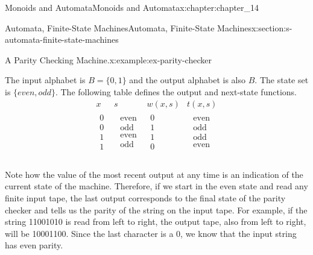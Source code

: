 \documentclass[twoside,10pt,]{book}
\numberwithin{equation}{section}
\begin{document}
\begin{chapterptx}{Monoids and Automata}{}{Monoids and Automata}{}{}{x:chapter:chapter_14}
\begin{sectionptx}{Automata, Finite-State Machines}{}{Automata, Finite-State Machines}{}{}{x:section:s-automata-finite-state-machines}
\begin{example}{A Parity Checking Machine.}{x:example:ex-parity-checker}
\par
The input alphabet is \(B=\{0,1\}\) and the output alphabet is also \(B\). The state set is \(\{even, odd\}\). The following table defines the output and next-state functions.%
\begin{equation*}
\begin{array}{c|ccc}
x & s & w(x,s) & t(x,s) \\
\hline
\begin{array}{c}
0 \\
0 \\
1 \\
1 \\
\end{array}
& 
\begin{array}{c}
\textrm{ even} \\
\textrm{ odd} \\
\textrm{ even} \\
\textrm{ odd} \\
\end{array}
& 
\begin{array}{c}
0 \\
1 \\
1 \\
0 \\
\end{array}
& 
\begin{array}{c}
\textrm{ even} \\
\textrm{ odd} \\
\textrm{ odd} \\
\textrm{ even} \\
\end{array}
\\
\end{array}
\end{equation*}
%
\par
Note how the value of the most recent output at any time is an indication of the current state of the machine. Therefore, if we start in the even state and read any finite input tape, the last output corresponds to the final state of the parity checker and tells us the parity of the string on the input tape. For example, if the string 11001010 is read from left to right, the output tape, also from left to right, will be 10001100. Since the last character is a 0, we know that the input string has even parity.%
\end{example}

\end{sectionptx}
\end{chapterptx}
\end{document}
